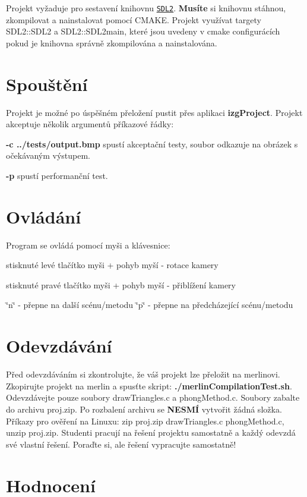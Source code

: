 Projekt vyžaduje pro sestavení knihovnu \href{https://www.libsdl.org/download-2.0.php}{\tt S\+D\+L2}. {\bfseries Musíte} si knihovnu stáhnou, zkompilovat a nainstalovat pomocí C\+M\+A\+KE. Projekt využívat targety S\+D\+L2\+::\+S\+D\+L2 a S\+D\+L2\+::\+S\+D\+L2main, které jsou uvedeny v cmake configurácích pokud je knihovna správně zkompilována a nainstalována.\hypertarget{index_spousteni}{}\section{Spouštění}\label{index_spousteni}
Projekt je možné po úspěšném přeložení pustit přes aplikaci {\bfseries izg\+Project}. Projekt akceptuje několik argumentů příkazové řádky\+:
\begin{DoxyItemize}
\item {\bfseries -\/c ../tests/output.bmp} spustí akceptační testy, soubor odkazuje na obrázek s očekávaným výstupem.
\item {\bfseries -\/p} spustí performanční test.
\end{DoxyItemize}\hypertarget{index_ovladani}{}\section{Ovládání}\label{index_ovladani}
Program se ovládá pomocí myši a klávesnice\+:
\begin{DoxyItemize}
\item stisknuté levé tlačítko myši + pohyb myší -\/ rotace kamery
\item stisknuté pravé tlačítko myši + pohyb myší -\/ přiblížení kamery
\item \char`\"{}n\char`\"{} -\/ přepne na další scénu/metodu \char`\"{}p\char`\"{} -\/ přepne na předcházející scénu/metodu
\end{DoxyItemize}\hypertarget{index_odevzdavani}{}\section{Odevzdávání}\label{index_odevzdavani}
Před odevzdáváním si zkontrolujte, že váš projekt lze přeložit na merlinovi. Zkopirujte projekt na merlin a spusťte skript\+: {\bfseries ./merlin\+Compilation\+Test.sh}. Odevzdávejte pouze soubory draw\+Triangles.\+c a phong\+Method.\+c. Soubory zabalte do archivu proj.\+zip. Po rozbalení archivu se {\bfseries N\+E\+S\+MÍ} vytvořit žádná složka. Příkazy pro ověření na Linuxu\+: zip proj.\+zip draw\+Triangles.\+c phong\+Method.\+c, unzip proj.\+zip. Studenti pracují na řešení projektu samostatně a každý odevzdá své vlastní řešení. Poraďte si, ale řešení vypracujte samostatně!\hypertarget{index_hodnoceni}{}\section{Hodnocení}\label{index_hodnoceni}
